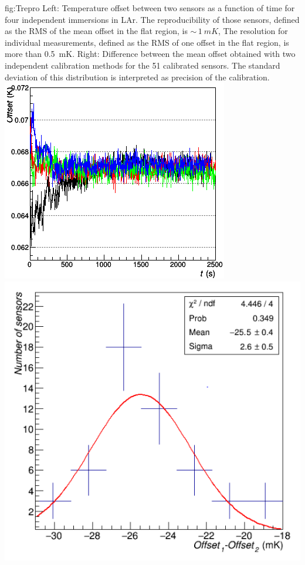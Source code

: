 \begin{dunefigure}{fig:Trepro}{
 Left:   Temperature offset between two sensors as a function of time for four independent immersions in LAr. The reproducibility of those sensors, defined as the RMS of the mean offset in the flat region, is $\sim\,\SI{1}{mK}$,
    The resolution for individual measurements, defined as the RMS of one offset in the flat region, is more than \SI{0.5}{mK}. Right: Difference between the mean offset obtained with two independent calibration methods for the 51 calibrated sensors. The standard deviation of this distribution is interpreted as precision of the calibration.}
  \includegraphics[height=0.44\textwidth]{graphics/cisc_tsensor_calib.png}%
  \includegraphics[height=0.45\textwidth]{graphics/cisc_tsensor_calib2.png}%
\end{dunefigure}



